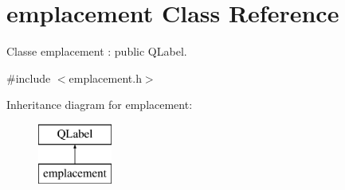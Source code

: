 \hypertarget{classemplacement}{\section{emplacement Class Reference}
\label{classemplacement}
}


Classe emplacement \-: public Q\-Label.  




{\ttfamily \#include $<$emplacement.\-h$>$}

Inheritance diagram for emplacement\-:\begin{figure}[H]
\begin{center}
\leavevmode
\includegraphics[height=2.000000cm]{classemplacement}
\end{center}
\end{figure}
